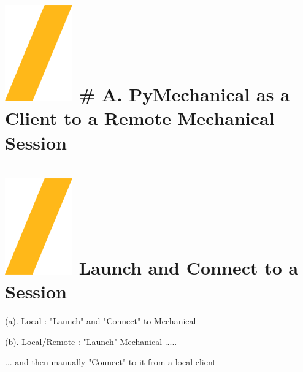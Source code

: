 \documentclass[9pt,landscape]{article}
\begin{document}
\begin{multicols}{3}
\setlength{\premulticols}{1pt}
\setlength{\postmulticols}{1pt}
\setlength{\multicolsep}{1pt}
\setlength{\columnsep}{2pt}

\vfill
\section{\includegraphics[height=\fontcharht\font`\S]{slash.png} # A. PyMechanical as a Client to a Remote Mechanical Session}

\vspace{5mm} %

\section{\includegraphics[height=\fontcharht\font`\S]{slash.png} Launch and Connect to a Session}

(a). Local : "Launch"  and "Connect" to Mechanical


(b). Local/Remote : "Launch" Mechanical .....


... and then  manually "Connect" to it from a local client





\end{multicols}
\end{document}
